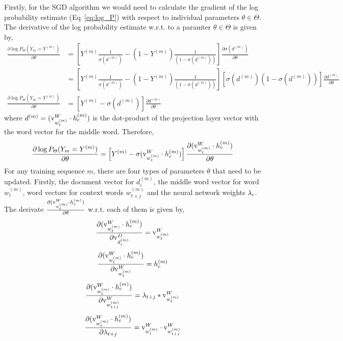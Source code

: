 Firstly, for the SGD algorithm we would need to calculate the gradient of the log probability estimate (Eq~\ref{eq:log_P}) with respect to individual parameters $\theta \in \Theta$. The derivative of the log probability estimate w.r.t. to a paramter $\theta \in \Theta$ is given by,
\begin{align}
\frac{\partial \log P_{\Theta}(Y_{m}=Y^{(m)})} {\partial \theta} &= \left[ Y^{(m)}\frac{1}{\sigma(d^{(m)})} - (1-Y^{(m)})\frac{1}{(1 - \sigma(d^{(m)}))}\right] \frac{\partial \sigma(d^{(m)})}{\partial \theta} \\
&= \left[ Y^{(m)}\frac{1}{ \sigma(d^{(m)})} - (1 - Y^{(m)})\frac{1}{(1 - \sigma(d^{(m)}))}\right] \left[\sigma(d^{(m)})(1-\sigma(d^{(m)}))\right]\frac{\partial d^{(m)}}{\partial \theta} \\
\frac{\partial \log P_{\Theta}(Y_{m}=Y^{(m)})} {\partial \theta} &= \left[ Y^{(m)} - \sigma(d^{(m)})\right] \frac{\partial d^{(m)}}{\partial \theta}
\end{align}
where $d^{(m)} = (\mathrm{v}^{W}_{w^{(m)}_{t}} \cdot h^{(m)}_{c})$ is the dot-product of the projection layer vector with the word vector for the middle word. Therefore,
\begin{equation}
\label{eq:partial_theta}
\frac{\partial \log P_{\Theta}(Y_{m}=Y^{(m)})} {\partial \theta} = \left[ Y^{(m)} - \sigma(\mathrm{v}^{W}_{w^{(m)}_{t}} \cdot h^{(m)}_{c})\right] \frac{\partial (\mathrm{v}^{W}_{w^{(m)}_{t}} \cdot h^{(m)}_{c})}{\partial \theta}
\end{equation}
For any training sequence $m$, there are four types of parameters $\theta$ that need to be updated. Firstly, the document vector for $d^{(m)}_{i}$, the middle word vector for word $w^{(m)}_{t}$, word vectors for context words $w^{(m)}_{t+j}$ and the neural network weights $\lambda_{i}$. The derivate $\frac{\partial (\mathrm{v}^{W}_{w^{(m)}_{t}} \cdot h^{(m)}_{c})}{\partial \theta}$ w.r.t. each of them is given by,
\begin{equation}
\label{eq:partial_doc}
\frac{\partial (\mathrm{v}^{W}_{w^{(m)}_{t}} \cdot h^{(m)}_{c})}{\partial \mathrm{v}^{D}_{d^{(m)}_{i}}} = \mathrm{v}^{W}_{w^{(m)}_{t}}
\end{equation}
\begin{equation}
\label{eq:partial_w_t}
\frac{\partial (\mathrm{v}^{W}_{w^{(m)}_{t}} \cdot h^{(m)}_{c})}{\partial \mathrm{v}^{W}_{w^{(m)}_{t}}} = h^{(m)}_{c}
\end{equation}
\begin{equation}
\label{eq:partial_w_t-k}
\frac{\partial (\mathrm{v}^{W}_{w^{(m)}_{t}} \cdot h^{(m)}_{c})}{\partial \mathrm{v}^{W}_{w^{(m)}_{t+j}}} = \lambda_{t+j}* \mathrm{v}^{W}_{w^{(m)}_{t}}
\end{equation}
\begin{equation}
\label{eq:partial_wgt_t-k}
\frac{\partial (\mathrm{v}^{W}_{w^{(m)}_{t}} \cdot h^{(m)}_{c})}{\partial \lambda_{t+j}} = \mathrm{v}^{W}_{w^{(m)}_{t}} \cdot \mathrm{v}^{W}_{w^{(m)}_{t+j}}
\end{equation}

